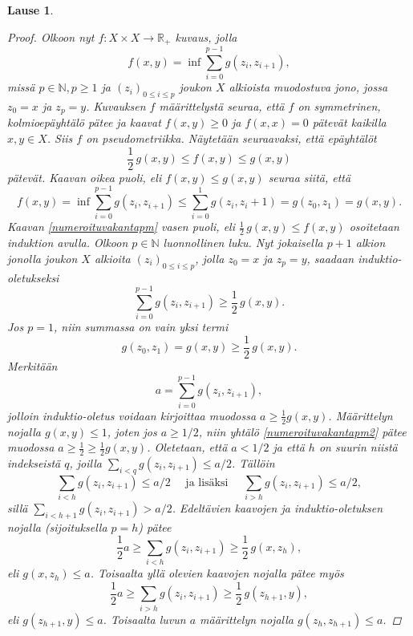 \documentclass[12pt,a4paper,leqno]{report}
\newcommand{\R}{\mathbb{R}}
\newcommand{\N}{\mathbb{N}}
\theoremstyle{plain}
\newtheorem{lause}[equation]{Lause}
\theoremstyle{definition}
\theoremstyle{remark}
\begin{document}
\begin{lause}
\begin{proof}
Olkoon nyt $f\colon X\times X\rightarrow \R_+$ kuvaus, 
jolla 
$$f(x,y)=\inf\sum_{i=0}^{p-1}g(z_i,z_{i+1}),$$
missä $p\in\N,p\geq 1$ ja $(z_i)_{0\leq i\leq p}$ 
joukon $X$ alkioista muodostuva jono, jossa $z_0=x$ ja $z_p=y$. 
Kuvauksen $f$ määrittelystä seuraa, 
että $f$ on symmetrinen, kolmioepäyhtälö pätee ja kaavat 
$f(x,y)\geq 0$ ja $f(x,x)=0$ pätevät kaikilla $x,y\in X$.
Siis $f$ on pseudometriikka. 
Näytetään seuraavaksi, että epäyhtälöt 
\begin{equation}\label{numeroituvakantapm}
\frac{1}{2}\,g(x,y)\leq f(x,y)\leq g(x,y)
\end{equation}
pätevät. 
Kaavan oikea puoli, eli $f(x,y)\leq g(x,y)$ seuraa siitä, 
että 
$$f(x,y)=\inf\sum_{i=0}^{p-1}g(z_i,z_{i+1})\leq\sum_{i=0}^1g(z_i,z_i+1)=g(z_0,z_1)=g(x,y).$$
Kaavan \ref{numeroituvakantapm} vasen puoli, 
eli $\frac{1}{2}\,g(x,y)\leq f(x,y)$ 
osoitetaan induktion avulla. 
Olkoon $p\in\N$ luonnollinen luku. 
Nyt jokaisella $p+1$ alkion jonolla joukon $X$ 
alkioita $ (z_i)_{0\leq i\leq p}$, 
jolla $z_0=x$ ja $z_p=y$, saadaan induktio-oletukseksi 
\begin{equation}\label{numeroituvakantapm2}
\sum_{i=0}^{p-1}g(z_i,z_{i+1})\geq \frac{1}{2}\,g(x,y).
\end{equation}
Jos $p=1$, niin summassa on vain yksi termi
$$g(z_0,z_{1})=g(x,y)\geq \frac{1}{2}\,g(x,y).$$
Merkitään 
\begin{equation}\label{numeroituvakantapm3}
a=\sum_{i=0}^{p-1}g(z_i,z_{i+1}),
\end{equation}
jolloin induktio-oletus voidaan kirjoittaa 
muodossa $a\geq \frac{1}{2}g(x,y) $. 
Määrittelyn nojalla $g(x,y)\leq 1$, joten jos $a\geq 1/2$, 
niin yhtälö \ref{numeroituvakantapm2} pätee muodossa 
$a\geq \frac{1}{2}\geq \frac{1}{2}g(x,y)$. 
Oletetaan, että $a<1/2$ ja että $h$ on suurin niistä indekseistä $q$, 
joilla $\sum_{i<q}g(z_i,z_{i+1})\leq a/2$. 
Tällöin 
\begin{equation*}\label{numeroituvakantapm4}
\sum_{i<h}g(z_i,z_{i+1})\leq a/2\quad\text{ ja lisäksi }\quad
\sum_{i>h}g(z_i,z_{i+1})\leq a/2,
\end{equation*}
sillä $\sum_{i<h+1}g(z_i,z_{i+1})> a/2$. 
Edeltävien kaavojen ja induktio-oletuksen nojalla 
(sijoituksella $p=h$) pätee
\begin{equation*}
\frac{1}{2}a\geq \sum_{i<h}g(z_i,z_{i+1})\geq \frac{1}{2}\,g(x,z_h),
\end{equation*}
eli $g(x,z_h)\leq a$. 
Toisaalta yllä olevien kaavojen nojalla pätee myös 
\begin{equation*}
\frac{1}{2}a\geq \sum_{i>h}g(z_i,z_{i+1})\geq \frac{1}{2}\,g(z_{h+1},y),
\end{equation*}
eli $g(z_{h+1},y)\leq a$. 
Toisaalta luvun $a$ 
määrittelyn nojalla 
$g(z_h,z_{h+1})\leq a$. 


\end{proof}
\end{lause}
\end{document}
